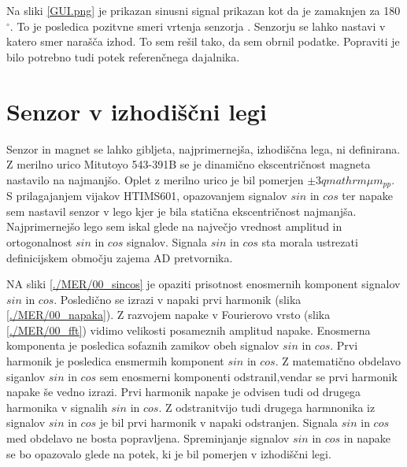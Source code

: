 Na sliki  \ref{GUI.png} je prikazan sinusni signal prikazan kot da je zamaknjen za 180$\mathrm{^\circ}$. To je posledica pozitvne smeri vrtenja senzorja \cite{RM44}. Senzorju se lahko nastavi v katero smer narašča izhod. To sem rešil tako, da sem obrnil podatke. Popraviti je bilo potrebno tudi potek referenčnega dajalnika.
\section{Senzor v izhodiščni legi}
Senzor in magnet se lahko gibljeta, najprimernejša, izhodiščna lega, ni definirana. Z merilno urico Mitutoyo 543-391B se je dinamično ekscentričnost magneta nastavilo na najmanjšo. Oplet z merilno urico je bil pomerjen $\pm 3 qmathrm{\mu m_{pp}}$.
S prilagajanjem vijakov HTIMS601, opazovanjem signalov $sin$ in $cos$ ter napake sem nastavil senzor v lego kjer je bila statična ekscentričnost najmanjša. Najprimernejšo lego sem iskal glede na največjo vrednost amplitud in ortogonalnost  $sin$ in $cos$ signalov. Signala $sin$ in $cos$ sta morala ustrezati definicijskem območju zajema AD pretvornika.


NA sliki \ref{./MER/00_sincos} je opaziti prisotnost enosmernih komponent signalov $sin$ in $cos$. Posledično se izrazi v napaki prvi harmonik (slika \ref{./MER/00_napaka}).
Z razvojem napake v Fourierovo vrsto (slika \ref{./MER/00_fft}) vidimo velikosti posameznih amplitud napake.
Enosmerna komponenta je posledica sofaznih zamikov obeh signalov $sin$ in $cos$. 
Prvi harmonik je posledica ensmermih komponent $sin$ in $cos$. Z matematično obdelavo siganlov $sin$ in $cos$ sem enosmerni komponenti odstranil,vendar se prvi harmonik napake še vedno izrazi. Prvi harmonik napake je odvisen tudi od drugega harmonika v signalih $sin$ in $cos$.
Z odstranitvijo tudi drugega harmnonika iz signalov $sin$ in $cos$ je bil  prvi harmonik v napaki odstranjen.
Signala  $sin$ in $cos$ med obdelavo ne bosta popravljena. Spreminjanje signalov  $sin$ in $cos$ in napake se bo opazovalo glede na potek, ki je bil pomerjen v izhodiščni legi.

